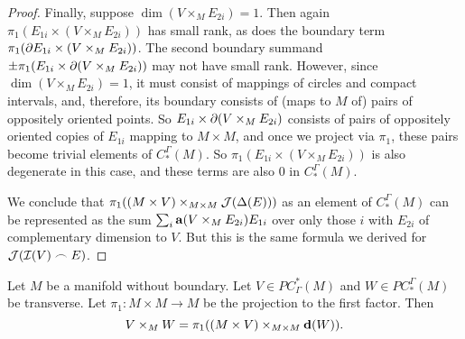 \begin{proof}
	Finally, suppose $\dim(V \times_M E_{2i}) = 1$.
	Then again $\pi_1(E_{1i} \times (V \times_M E_{2i}))$ has small rank, as does the boundary term $\pi_1(\partial E_{1i} \times (V \times_M E_{2i}))$.
	The second boundary summand $\pm\pi_1(E_{1i} \times \partial(V \times_M E_{2i}))$ may not have small rank.
	However, since $\dim(V \times_M E_{2i}) = 1$, it must consist of mappings of circles and compact intervals, and, therefore, its boundary consists of (maps to $M$ of) pairs of oppositely oriented points.
	So $E_{1i} \times \partial(V \times_M E_{2i})$ consists of pairs of oppositely oriented copies of $E_{1i}$ mapping to $M \times M$, and once we project via $\pi_1$, these pairs become trivial elements of $C^\Gamma_*(M)$.
	So $\pi_1(E_{1i} \times (V \times_M E_{2i}))$ is also degenerate in this case, and these terms are also $0$ in $C^\Gamma_*(M)$.

	\begin{comment}
		We also have
		$$\bd ( V \times_M E_{2i}) = \pm (\bd V) \times_M E_{2i}\pm V \times_M \bd E_{2i}$$.
		Since $V$ is a cocycle, $\bd V$ is a union of trivial or small rank precochains, and hence so is $(\bd V) \times_M E_{2i}$ by Lemma \ref{L: pullback with Q}.
		If $\dim( V \times_M \bd E_{2i})>0$, then $\pi(V \times_M \bd E_{2i})$ has small rank.
		Finally, suppose $\dim (V \times_M \bd E_{2i}) = 0$.
		Then $\dim(V \times_M E_{2i}) = 1$.
		So $V \times_M E_{2i}$ consists of some number of circles and closed intervals in $E_{2i}$, and $V \times_M \bd E_{2i}$ will be the endpoints of those intervals.
		Since these must occur in pairs of opposite signs, then $E_{1i} \times (V \times_M \bd E_{2i})$ will consist of chains $\pm E_{1i} \times pt$, with the points being the points of $V \times_M \bd E_{2i}$.
		Since the points occur in oppositely signed pairs, under $\pi_1$ these pairs become trivial in $M$.
		Altogether then $\pi_1(\bd ( V \times_M E_{2i}))$ is a disjoint union of trivial and small rank precochains.
		So $V \times_M E_{2i} \in Q_*(M)$.
	\end{comment}

	We conclude that $\pi_1( (M \times V)\times_{M \times M}\mathcal{J}(\Delta(E)))$ as an element of $C_*^\Gamma(M)$ can be represented as the sum $\sum_i \mathbf{a}(V \times_M E_{2i})E_{1i}$ over only those $i$ with $E_{2i}$ of complementary dimension to $V$.
	But this is the same formula we derived for $\mathcal{J}(\mathcal{I}(V)\frown E)$.
\end{proof}

\begin{lemma}\label{L: diagonal version of intersection}
	Let $M$ be a manifold without boundary.
	Let $V \in PC^*_\Gamma(M)$ and $W \in PC_*^\Gamma(M)$ be transverse.
	Let $\pi_1 \colon M \times M \to M$ be the projection to the first factor.
	Then $$V \times_M W = \pi_1((M \times V)\times_{M \times M} \mathbf{d}(W)).$$
\end{lemma}

